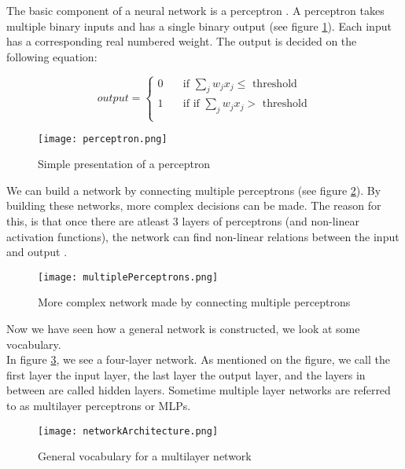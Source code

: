 The basic component of a neural network is a perceptron \cite{perceptron:article}. A perceptron takes multiple binary inputs and has a single binary output (see figure \ref{fig:perceptron}). Each input has a corresponding real numbered weight. The output is decided on the following equation:

\begin{equation} 
output =
  \begin{cases}
    0       	& \quad \text{if } \sum_j w_jx_j \leq \text{ threshold}\\
    1  		& \quad \text{if } \text{if } \sum_j w_jx_j > \text{ threshold}\\
  \end{cases}
\end{equation}
	
\begin{figure}[H]
	\centering
	\texttt{[image: perceptron.png]}
	\caption{Simple presentation of a perceptron \cite{NNintro:online}}
	\label{fig:perceptron}
\end{figure}

We can build a network by connecting multiple perceptrons (see figure \ref{fig:multiplePerceptrons}). By building these networks, more complex decisions can be made. The reason for this, is that once there are atleast $3$ layers of perceptrons (and non-linear activation functions), the network can find non-linear relations between the input and output \cite{nnNL:article}.

\begin{figure}[H]
	\centering
	\texttt{[image: multiplePerceptrons.png]}
	\caption{More complex network made by connecting multiple perceptrons \cite{NNintro:online}}
	\label{fig:multiplePerceptrons}
\end{figure}

Now we have seen how a general network is constructed, we look at some vocabulary. \\
In figure \ref{fig:networkArch}, we see a four-layer network. As mentioned on the figure, we call the first layer the input layer, the last layer the output layer, and the layers in between are called hidden layers. Sometime multiple layer networks are referred to as multilayer perceptrons or MLPs.

\begin{figure}[H]
	\centering
	\texttt{[image: networkArchitecture.png]}
	\caption{General vocabulary for a multilayer network \cite{NNintro:online}}
	\label{fig:networkArch}
\end{figure} 		


